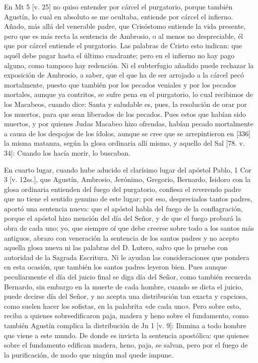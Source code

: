 En Mt 5 [v. 25] no quiso entender por cárcel el purgatorio, porque también Agustín, lo cual en absoluto se me ocultaba, entiende por cárcel el infierno. Añado, más allá del venerable padre, que Crisóstomo entiende la vida presente, pero que es más recta la sentencia de Ambrosio, o al menos no despreciable, él que por cárcel entiende el purgatorio. Las palabras de Cristo esto indican: que aquél debe pagar hasta el último cuadrante; pero en el infierno no hay pago alguno, como tampoco hay redención. Ni el subterfugio añadido puede rechazar la exposición de Ambrosio, a saber, que el que ha de ser arrojado a la cárcel pecó mortalmente, puesto que también por los pecados veniales y por los pecados mortales, aunque ya contritos, se sufre pena en el purgatorio, lo cual recibimos de los Macabeos, cuando dice: Santa y saludable es, pues, la resolución de orar por los muertos, para que sean liberados de los pecados. Pues estos que habían sido muertos, y por quienes Judas Macabeo hizo ofrendas, habían pecado mortalmente a causa de los despojos de los ídolos, aunque se cree que se arrepintieron en [336] la misma matanza, según la glosa ordinaria allí mismo, y aquello del Sal [78. v. 34]: Cuando los hacía morir, lo buscaban.

En cuarto lugar, cuando hube aducido el clarísimo lugar del apóstol Pablo, 1 Cor 3 [v. 12ss.], que Agustín, Ambrosio, Jerónimo, Gregorio, Bernardo, Isidoro con la glosa ordinaria entienden del fuego del purgatorio, confiesa el reverendo padre que no tiene el sentido genuino de este lugar; por eso, despreciados tantos padres, aportó una sentencia nueva: que el apóstol habla del fuego de la conflagración, porque el apóstol hizo mención del día del Señor, y de que el fuego probará la obra de cada uno; yo, que siempre oí que debe creerse sobre todo a los santos más antiguos, abrazo con veneración la sentencia de los santos padres y no acepto aquella glosa nueva ni las palabras del D. Lutero, salvo que lo pruebe con autoridad de la Sagrada Escritura. Ni le ayudan las consideraciones que pondera en esta ocasión, que también los santos padres leyeron bien. Pues aunque peculiarmente el día del juicio final se diga día del Señor, como también recuerda Bernardo, sin embargo en la muerte de cada hombre, cuando se dicta el juicio, puede decirse día del Señor, y no acepta una distribución tan exacta y capciosa, como suelen hacer los sofistas, en la palabrita «de cada uno». Pero sobre esto, reciba a quienes sobreedificaron paja, madera y heno sobre el fundamento, como también Agustín complica la distribución de Jn 1 [v. 9]: Ilumina a todo hombre que viene a este mundo. De donde es invicta la sentencia apostólica: que quienes sobre el fundamento edifican madera, heno, paja, se salvan, pero por el fuego de la purificación, de modo que ningún mal quede impune.

